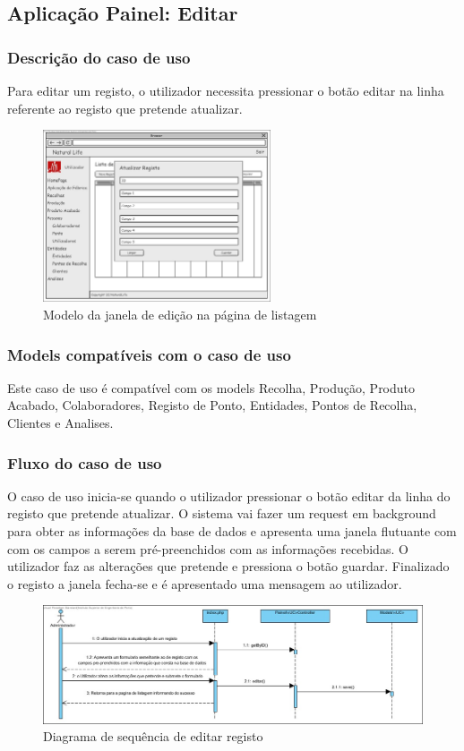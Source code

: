 \subsection{Aplicação Painel: Editar}
\subsubsection*{Descrição do caso de uso}
Para editar um registo, o utilizador necessita pressionar o botão editar na linha referente ao registo que pretende atualizar. 

\begin{figure}[H] 
	\begin{center}
		\includegraphics[width=0.60\textwidth,keepaspectratio]{figuras/Diagramas_vp/DI_Painel_3_Editar.jpg}
		\caption{Modelo da janela de edição na página de listagem}
		\label{fig:di_editar} 
	\end{center}
\end{figure}

\subsubsection*{Models compatíveis com o caso de uso}
Este caso de uso é compatível com os models Recolha, Produção, Produto Acabado, Colaboradores, Registo de Ponto, Entidades, Pontos de Recolha, Clientes e Analises.

\subsubsection*{Fluxo do caso de uso}
O caso de uso inicia-se quando o utilizador pressionar o botão editar da linha do registo que pretende atualizar. O sistema vai fazer um request em background para obter as informações da base de dados e apresenta uma janela flutuante com com os campos a serem pré-preenchidos com as informações recebidas. O utilizador faz as alterações que pretende e pressiona o botão guardar. Finalizado o registo a janela fecha-se e é apresentado uma mensagem ao utilizador.


\begin{figure}[H] 
	\begin{center}
		\includegraphics[width=\textwidth,keepaspectratio]{figuras/Diagramas_vp/SD_Painel_3_Editar.jpg}
		\caption{Diagrama de sequência de editar registo}
		\label{fig:sd_editar} 
	\end{center}
\end{figure}